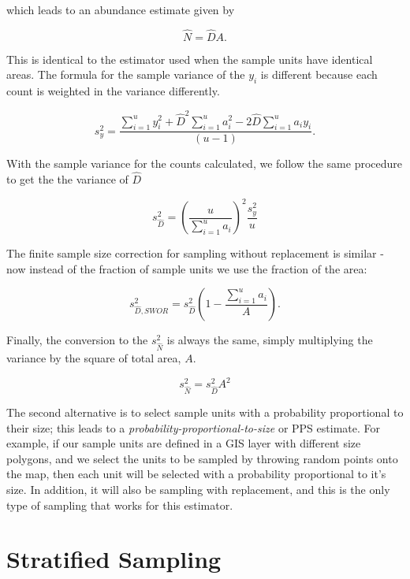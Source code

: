 \documentclass[]{book}
\theoremstyle{definition}
\theoremstyle{definition}
\theoremstyle{definition}
\theoremstyle{remark}
\begin{document}
which leads to an abundance estimate given by

\begin{equation}
  \hat{N} = \hat{D} A.
\end{equation}

This is identical to the estimator used when the sample units have
identical areas. The formula for the sample variance of the \(y_i\) is
different because each count is weighted in the variance differently.

\begin{equation}
  s_y^2 = \frac{\sum_{i=1}^u{y_i^2}+\hat{D}^2\sum_{i=1}^u{a_i^2}-2\hat{D}\sum_{i=1}^u{a_iy_i}}{\left(u-1\right)}.
  \label{eq:samplevarianceRatio}
\end{equation}

With the sample variance for the counts calculated, we follow the same
procedure to get the the variance of \(\hat{D}\)

\begin{equation}
  s_{\hat{D}}^2 = \left(\frac{u}{\sum_{i=1}^u{a_i}}\right)^2\frac{s_y^2}{u}
  \label{eq:densityvarwrRatio}
\end{equation}

The finite sample size correction for sampling without replacement is
similar - now instead of the fraction of sample units we use the
fraction of the area:

\begin{equation}
  s_{\hat{D},SWOR}^2 = s_{\hat{D}}^2\left(1-\frac{\sum_{i=1}^u{a_i}}{A}\right).
  \label{eq:densityvarworRatio}
\end{equation}

Finally, the conversion to the \(s_{\hat{N}}^2\) is always the same,
simply multiplying the variance by the square of total area, \(A\).

\[
  s_{\hat{N}}^2 = s_{\hat{D}}^2 A^2 
\]

The second alternative is to select sample units with a probability
proportional to their size; this leads to a
\emph{probability-proportional-to-size} or PPS estimate. For example, if
our sample units are defined in a GIS layer with different size
polygons, and we select the units to be sampled by throwing random
points onto the map, then each unit will be selected with a probability
proportional to it's size. In addition, it will also be sampling with
replacement, and this is the only type of sampling that works for this
estimator.

\hypertarget{stratified-sampling}{%
\section{Stratified Sampling}\label{stratified-sampling}}
\end{document}
